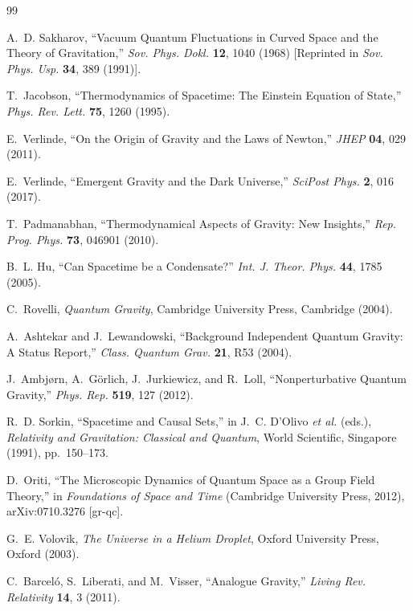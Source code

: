 \documentclass[a4paper,fleqn]{cas-dc}
\theoremstyle{thmstyleone}%
\theoremstyle{thmstyletwo}%
\begin{document}
\begin{thebibliography}{99}

A.~D. Sakharov,
``Vacuum Quantum Fluctuations in Curved Space and the Theory
of Gravitation,''
\textit{Sov. Phys. Dokl.} \textbf{12}, 1040 (1968) 
[Reprinted in \textit{Sov. Phys. Usp.} \textbf{34}, 389 (1991)].

T.~Jacobson,
``Thermodynamics of Spacetime: The Einstein Equation of State,''
\textit{Phys. Rev. Lett.} \textbf{75}, 1260 (1995).

E.~Verlinde,
``On the Origin of Gravity and the Laws of Newton,''
\textit{JHEP} \textbf{04}, 029 (2011).

E.~Verlinde,
``Emergent Gravity and the Dark Universe,''
\textit{SciPost Phys.} \textbf{2}, 016 (2017).

T.~Padmanabhan,
``Thermodynamical Aspects of Gravity: New Insights,''
\textit{Rep. Prog. Phys.} \textbf{73}, 046901 (2010).

B.~L. Hu,
``Can Spacetime be a Condensate?''
\textit{Int. J. Theor. Phys.} \textbf{44}, 1785 (2005).

C.~Rovelli,
\textit{Quantum Gravity},
Cambridge University Press, Cambridge (2004).

A.~Ashtekar and J.~Lewandowski,
``Background Independent Quantum Gravity: A Status Report,''
\textit{Class. Quantum Grav.} \textbf{21}, R53 (2004).

J.~Ambj{\o}rn, A.~G\"orlich, J.~Jurkiewicz, and R.~Loll,
``Nonperturbative Quantum Gravity,''
\textit{Phys. Rep.} \textbf{519}, 127 (2012).

R.~D. Sorkin,
``Spacetime and Causal Sets,''
in J.~C. D'Olivo \textit{et al.} (eds.),
\textit{Relativity and Gravitation: Classical and Quantum},
World Scientific, Singapore (1991), pp.~150--173.

D.~Oriti,
``The Microscopic Dynamics of Quantum Space as a Group Field Theory,''
in \textit{Foundations of Space and Time}
(Cambridge University Press, 2012),
arXiv:0710.3276 [gr-qc].

G.~E. Volovik,
\textit{The Universe in a Helium Droplet},
Oxford University Press, Oxford (2003).

C.~Barcel\'o, S.~Liberati, and M.~Visser,
``Analogue Gravity,''
\textit{Living Rev. Relativity} \textbf{14}, 3 (2011).


\end{thebibliography}
\end{document}
